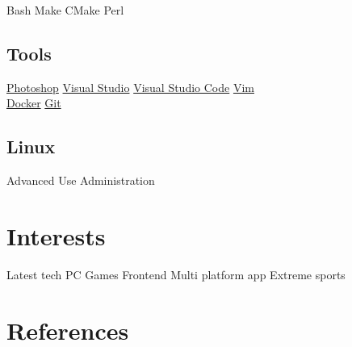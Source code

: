 \documentclass[a4paper,final]{deedy-resume}%
\newcommand{\mySep}{{\color{black!40!white}\textbullet{}}}
\newcommand{\mySmallSpace}{\vspace{3pt}}
\begin{document}
\begin{minipage}[t]{0.33\textwidth}
	{\small
		Bash \mySep{}
		Make \mySep{}
		CMake \mySep{}
		Perl
		\mySmallSpace{}
	}

	\sectionspace %

	\subsection{Tools}
	{\small
		\href{http://www.adobe.com/products/photoshop.html}{Photoshop} \mySep{}
		\href{https://www.visualstudio.com/}{Visual Studio} \mySep{}
		\href{https://code.visualstudio.com/}{Visual Studio Code} \mySep{}
		\href{http://www.vim.org/}{Vim} \\
		\href{https://www.docker.com/}{Docker} \mySep{}
		\href{https://git-scm.com/}{Git}
	}

	\sectionspace %

	\subsection{Linux}
	Advanced Use \mySep{}
	Administration

	\section{Interests}
	 {Latest tech} \mySep{}
	{PC Games} \mySep{}
	{Frontend} \mySep{}
	{Multi platform app} \mySep{}
	{Extreme sports}
	\section{References}

	\href{https://github.com/rajzik}{}

	\sectionspace %



\end{minipage} %
\hfill
%
%
\end{document}
